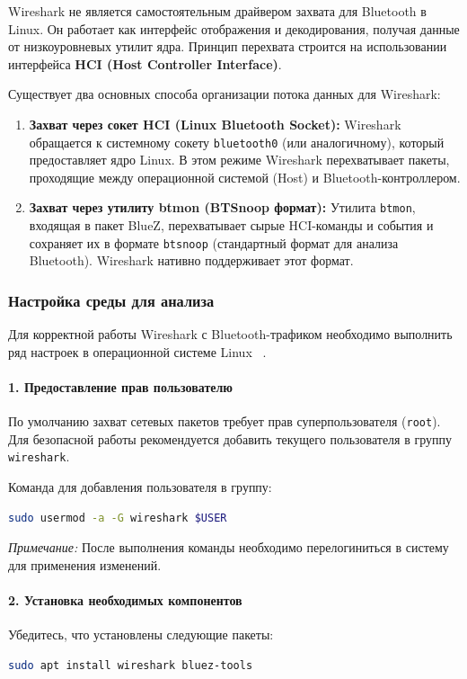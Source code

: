 Wireshark не является самостоятельным драйвером захвата для Bluetooth в Linux. Он работает как интерфейс отображения и декодирования, получая данные от низкоуровневых утилит ядра. Принцип перехвата строится на использовании интерфейса \textbf{HCI (Host Controller Interface)}.

Существует два основных способа организации потока данных для Wireshark:

\begin{enumerate}[nosep]
    \item \textbf{Захват через сокет HCI (Linux Bluetooth Socket):}
    Wireshark обращается к системному сокету \texttt{bluetooth0} (или аналогичному), который предоставляет ядро Linux. В этом режиме Wireshark перехватывает пакеты, проходящие между операционной системой (Host) и Bluetooth-контроллером.

    \item \textbf{Захват через утилиту btmon (BTSnoop формат):}
    Утилита \texttt{btmon}, входящая в пакет BlueZ, перехватывает сырые HCI-команды и события и сохраняет их в формате \texttt{btsnoop} (стандартный формат для анализа Bluetooth). Wireshark нативно поддерживает этот формат.
\end{enumerate}

\subsubsection{Настройка среды для анализа}

Для корректной работы Wireshark с Bluetooth-трафиком необходимо выполнить ряд настроек в операционной системе Linux ~\cite{wireshark_setup}.

\paragraph{1. Предоставление прав пользователю}
По умолчанию захват сетевых пакетов требует прав суперпользователя (\texttt{root}). Для безопасной работы рекомендуется добавить текущего пользователя в группу \texttt{wireshark}.

Команда для добавления пользователя в группу:
\begin{lstlisting}[language=bash]
sudo usermod -a -G wireshark $USER
\end{lstlisting}
\textit{Примечание:} После выполнения команды необходимо перелогиниться в систему для применения изменений.

\paragraph{2. Установка необходимых компонентов}
Убедитесь, что установлены следующие пакеты:
\begin{lstlisting}[language=bash]
sudo apt install wireshark bluez-tools
\end{lstlisting}

